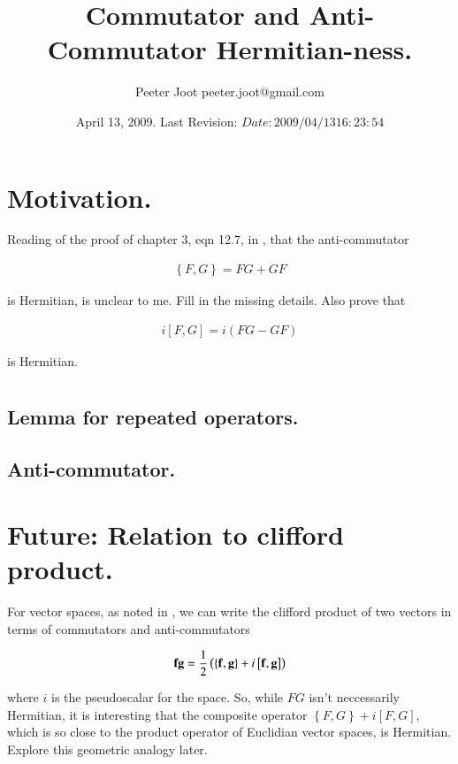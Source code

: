 \documentclass{article}
\title{ Commutator and Anti-Commutator Hermitian-ness. }
\author{Peeter Joot \quad peeter.joot@gmail.com }
\date{ April 13, 2009.  Last Revision: $Date: 2009/04/13 16:23:54 $ }
\newcommand{\symmetric}[2]{{\left\{{#1},{#2}\right\}}}
\newcommand{\antisymmetric}[2]{\left[{#1},{#2}\right]}
\begin{document}
\maketitle{}

\tableofcontents

\section{ Motivation. }

Reading of the proof of chapter 3, eqn 12.7, in \cite{pauli2000wm},
that the anti-commutator 

\begin{align*}
\symmetric{F}{G} = {F G + G F}
\end{align*}

is Hermitian, is unclear to me.  Fill in the missing details.  Also prove that 

\begin{align*}
i \antisymmetric{F}{G} = i (F G - G F)
\end{align*}

is Hermitian.


\section{ }
\subsection{ Lemma for repeated operators. }

\subsection{ Anti-commutator. }

\section{ Future: Relation to clifford product. }

For vector spaces, as noted in \cite{PJpauliMatrix},
we can write the clifford product of two  vectors in terms of commutators and anti-commutators

\begin{align*}
\Bf \Bg = \inv{2} \left( \symmetric{\Bf}{\Bg} + i \antisymmetric{\Bf}{\Bg} \right)
\end{align*}

where $i$ is the pseudoscalar for the space.  So, while $FG$ isn't neccessarily Hermitian, it is interesting that the composite operator
$\symmetric{F}{G} + i \antisymmetric{F}{G}$, which is so close to the product operator of Euclidian vector spaces, is Hermitian.
Explore this geometric analogy later.



\end{document}

